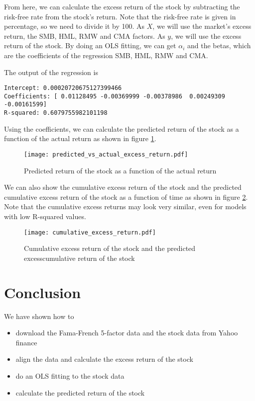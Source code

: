 \documentclass{article}
\begin{document}
From here, we can calculate the excess return of the stock by subtracting the risk-free rate from the stock's return.
Note that the risk-free rate is given in percentage, so we need to divide it by 100.
As $X$, we will use the market's excess return, the SMB, HML, RMW and CMA factors.
As $y$, we will use the excess return of the stock.
By doing an OLS fitting, we can get $\alpha_i$ and the betas,
which are the coefficients of the regression SMB, HML, RMW and CMA.

The output of the regression is
\footnotesize
\begin{verbatim}
Intercept: 0.00020720675127399466
Coefficients: [ 0.01128495 -0.00369999 -0.00378986  0.00249309 -0.00161599]
R-squared: 0.6079755982101198
\end{verbatim}
\normalsize

Using the coefficients, we can calculate the predicted return of the stock
as a function of the actual return as shown in
figure \ref{fig:predicted_return}.
\begin{figure}[ht]
    \centering
    \texttt{[image: predicted\_vs\_actual\_excess\_return.pdf]}
    \caption{Predicted return of the stock as a function of the actual return}
    \label{fig:predicted_return}
\end{figure}

We can also show the cumulative excess return of the stock and
the predicted cumulative excess return of the stock as a function of time as shown in
figure \ref{fig:cumulative_return}. Note that the cumulative excess returns
may look very similar, even for models with low R-squared values.

\begin{figure}[ht]
    \centering
    \texttt{[image: cumulative\_excess\_return.pdf]}
    \caption{Cumulative excess return of the stock and
        the predicted excesscumulative return of the stock}
    \label{fig:cumulative_return}
\end{figure}

\section*{Conclusion}
We have shown how to
\begin{itemize}
    \item download the Fama-French 5-factor data and the stock data from Yahoo finance
    \item align the data and calculate the excess return of the stock
    \item do an OLS fitting to the stock data
    \item calculate the predicted return of the stock
\end{itemize}
\end{document}
